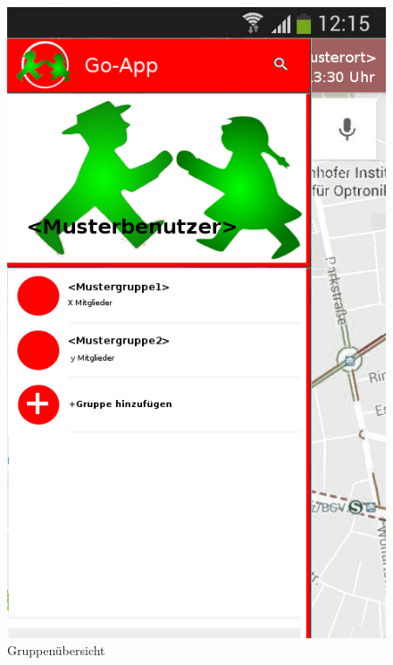 \begin{figure} [H]
	\caption{Gruppenübersicht}
\begin{center}
	\includegraphics[scale = 0.5]{resources/images/gruppenuebersicht.png}
\end{center}
\end{figure}

